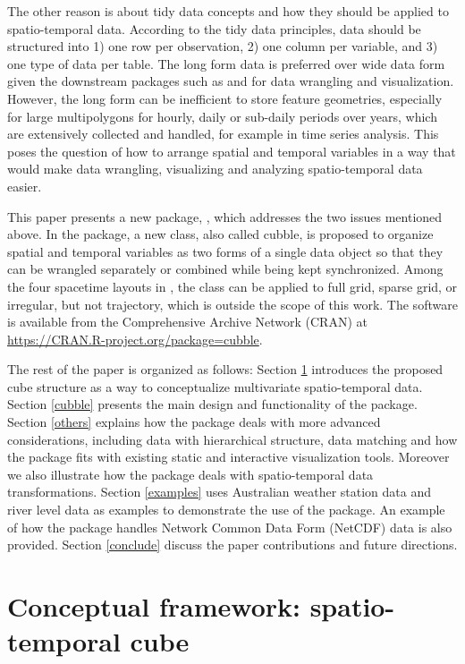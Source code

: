 \documentclass[
  shortnames]{jss}
\begin{document}
The other reason is about tidy data concepts \citep{tidydata} and how they should be applied to spatio-temporal data. According to the tidy data principles, data should be structured into 1) one row per observation, 2) one column per variable, and 3) one type of data per table. The long form data is preferred over wide data form given the downstream packages such as  \citep{dplyr} and  \citep{ggplot2} for data wrangling and visualization. However, the long form can be inefficient to store feature geometries, especially for large multipolygons for hourly, daily or sub-daily periods over years, which are extensively collected and handled, for example in time series analysis. This poses the question of how to arrange spatial and temporal variables in a way that would make data wrangling, visualizing and analyzing spatio-temporal data easier.

This paper presents a new  package, , which addresses the two issues mentioned above. In the package, a new class, also called cubble, is proposed to organize spatial and temporal variables as two forms of a single data object so that they can be wrangled separately or combined while being kept synchronized. Among the four spacetime layouts in \citet{spacetime}, the  class can be applied to full grid, sparse grid, or irregular, but not trajectory, which is outside the scope of this work. The software is available from the Comprehensive  Archive Network (CRAN) at \url{https://CRAN.R-project.org/package=cubble}.

The rest of the paper is organized as follows: Section \ref{cube} introduces the proposed cube structure as a way to conceptualize multivariate spatio-temporal data. Section \ref{cubble} presents the main design and functionality of the  package. Section \ref{others} explains how the  package deals with more advanced considerations, including data with hierarchical structure, data matching and how the package fits with existing static and interactive visualization tools. Moreover we also illustrate how the  package deals with spatio-temporal data transformations. Section \ref{examples} uses Australian weather station data and river level data as examples to demonstrate the use of the package. An example of how the  package handles Network Common Data Form (NetCDF) data is also provided. Section \ref{conclude} discuss the paper contributions and future directions.

\hypertarget{cube}{%
\section{Conceptual framework: spatio-temporal cube}\label{cube}}
\end{document}
